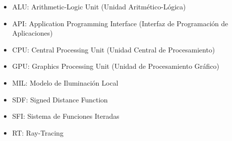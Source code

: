 \begin{itemize}
\item ALU: Arithmetic-Logic Unit (Unidad Aritmético-Lógica)
\item API: Application Programming Interface (Interfaz de Programación de Aplicaciones)
\item CPU: Central Processing Unit (Unidad Central de Procesamiento)
\item GPU: Graphics Processing Unit (Unidad de Procesamiento Gráfico)
\item MIL: Modelo de Iluminación Local
\item SDF: Signed Distance Function
\item SFI: Sistema de Funciones Iteradas
\item RT: Ray-Tracing
\end{itemize}